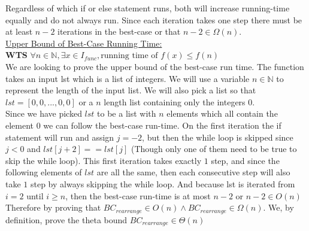 \documentclass[20pt]{article}
\begin{document}
\begin{enumerate}
    Regardless of which if or else statement runs, both will increase running-time equally and do not always run. Since each iteration takes one step there must be at least $n-2$ iterations in the best-case or that $n-2 \in \Omega(n)$.\\
    
    \underline{Upper Bound of Best-Case Running Time:}\\
    \textbf{WTS} $\forall n\in\mathbb{N}, \exists x\in I_{func}, \text{running time of } f(x) \leq f(n)\nonumber$\\
    We are looking to prove the upper bound of the best-case run time. The function takes an input lst which is a list of integers. We will use a variable $n\in\mathbb{N}$ to represent the length of the input list. We will also pick a list so that $lst = [0, 0,..., 0, 0]$ or a $n$ length list containing only the integers $0$.\\
    
    Since we have picked $lst$ to be a list with $n$ elements which all contain the element $0$ we can follow the best-case run-time. On the first iteration the if statement will run and assign $j = -2$, but then the while loop is skipped since $j < 0$ and $lst[j+2] == lst[j]$ (Though only one of them need to be true to skip the while loop). This first iteration takes exactly $1$ step, and since the following elements of $lst$ are all the same, then each consecutive step will also take $1$ step by always skipping the while loop. And because lst is iterated from $i = 2$ until $i\geq n$, then the best-case run-time is at most $n-2$ or $n-2 \in O(n)$\\
    
    
    Therefore by proving  that $BC_{rearrange} \in O(n) \land BC_{rearrange} \in \Omega(n)$. We, by definition, prove the theta bound $BC_{rearrange} \in \Theta(n)$ \hfill\Box
    
\end{enumerate}
\end{document}
